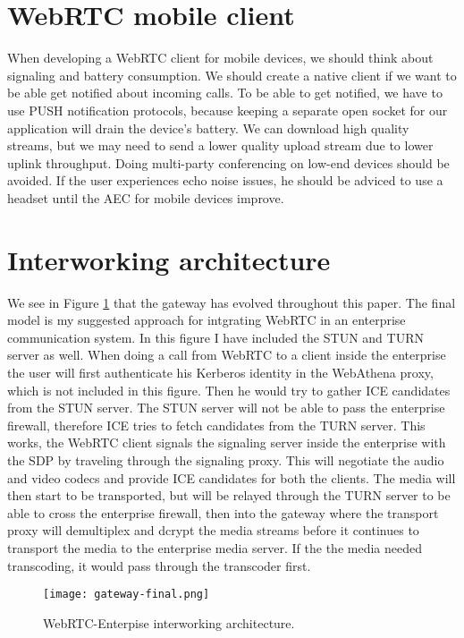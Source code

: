 \section{WebRTC mobile client}
When developing a WebRTC client for mobile devices, we should think about signaling and battery consumption. We should create a native client if we want to be able get notified about incoming calls. To be able to get notified, we have to use PUSH notification protocols, because keeping a separate open socket for our application will drain the device's battery. We can download high quality streams, but we may need to send a lower quality upload stream due to lower uplink throughput. Doing multi-party conferencing on low-end devices should be avoided. If the user experiences echo noise issues, he should be adviced to use a headset until the AEC for mobile devices improve.

\section{Interworking architecture}

We see in Figure \ref{fig:gateway-final} that the gateway has evolved throughout this paper. The final model is my suggested approach for intgrating WebRTC in an enterprise communication system. In this figure I have included the STUN and TURN server as well. When doing a call from WebRTC to a client inside the enterprise the user will first authenticate his Kerberos identity in the WebAthena proxy, which is not included in this figure. Then he would try to gather ICE candidates from the STUN server. The STUN server will not be able to pass the enterprise firewall, therefore ICE tries to fetch candidates from the TURN server. This works, the WebRTC client signals the signaling server inside the enterprise with the SDP by traveling through the signaling proxy. This will negotiate the audio and video codecs and provide ICE candidates for both the clients. The media will then start to be transported, but will be relayed through the TURN server to be able to cross the enterprise firewall, then into the gateway where the transport proxy will demultiplex and dcrypt the media streams before it continues to transport the media to the enterprise media server. If the the media needed transcoding, it would pass through the transcoder first.
\\
\begin{figure}[here]
\centerline{\texttt{[image: gateway-final.png]}}
\caption{WebRTC-Enterpise interworking architecture.}
\label{fig:gateway-final}
\end{figure}


